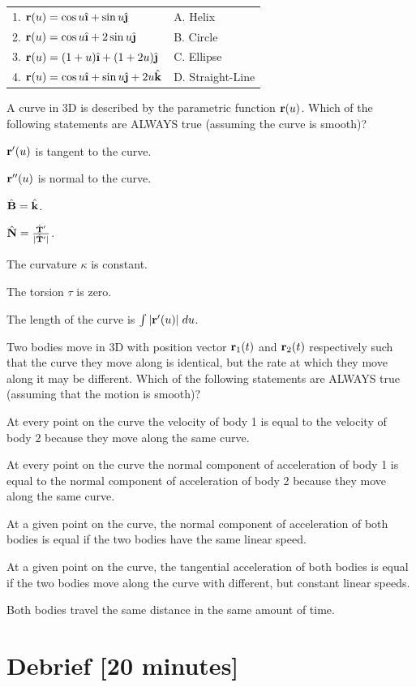 \documentclass{tufte-handout}
\begin{document}
\begin{tabular}{ll}
1. $\r(u) = \cos u \ihat + \sin u \jhat$ & A. Helix \\
2. $\r(u) = \cos u \ihat + 2 \sin u \jhat$ & B. Circle \\
3. $\r(u) = (1+u) \ihat + (1+ 2u) \jhat$ & C. Ellipse \\
4. $\r(u) = \cos u \ihat + \sin u \jhat + 2u \khat$ & D. Straight-Line
\end{tabular}
\item A curve in 3D is described by the parametric function $\mathbf{r}(u)$. Which of the following statements are ALWAYS true (assuming the curve is smooth)?
\be
\item $\mathbf{r}'(u)$ is tangent to the curve.
\item $\mathbf{r}''(u)$ is normal to the curve.
\item $\hat{\mathbf{B}} = \hat{\mathbf{k}}$.
\item $\hat{\mathbf{N}} = \frac{\hat{\mathbf{T}}'}{|\hat{\mathbf{T}}'|}$.
\item The curvature $\kappa$  is constant.
\item The torsion $\tau$ is zero.
\item The length of the curve is $\int |\mathbf{r}'(u)|\; du$.
\ee
\item Two bodies move in 3D with position vector $\mathbf{r}_1(t)$ and $\mathbf{r}_2(t)$ respectively such that the curve they move along is identical, but the rate at which they move along it may be different. Which of the following statements are ALWAYS true (assuming that the motion is smooth)?
\be
\item At every point on the curve the velocity of body 1 is equal to the velocity of body 2 because they move along the same curve.
\item At every point on the curve the normal component of acceleration of body 1 is equal to the normal component of acceleration of body 2 because they move along the same curve.
\item At a given point on the curve, the normal component of acceleration of both bodies is equal if the two bodies have the same linear speed.
\item At a given point on the curve, the tangential acceleration of both bodies is equal if the two bodies move along the curve with different, but constant linear speeds.
\item Both bodies travel the same distance in the same amount of time.
\ee
\ee

\section{Debrief [20 minutes]}
\end{document}
